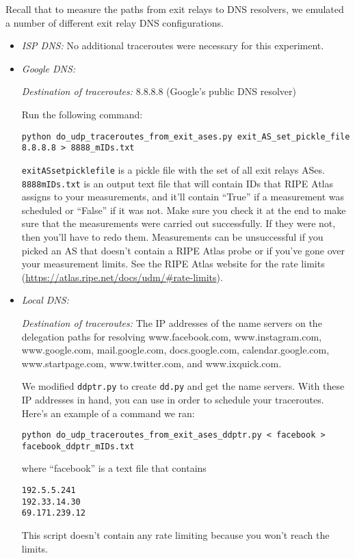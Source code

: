 \documentclass{article}
\begin{document}
Recall that to measure the paths from exit relays to DNS resolvers, we 
emulated a number of different exit relay DNS configurations.
\begin{itemize}

\item \emph{ISP DNS:} No additional traceroutes were necessary for this experiment. 

\item \emph{Google DNS:} 

\emph{Destination of traceroutes:} 8.8.8.8 (Google's public DNS resolver)

Run the following command:
\begin{lstlisting}
python do_udp_traceroutes_from_exit_ases.py exit_AS_set_pickle_file 8.8.8.8 > 8888_mIDs.txt
\end{lstlisting}
{\tt exit\textunderscore AS\textunderscore set\textunderscore pickle\textunderscore file} 
is a pickle file with the set of all exit relays ASes. 
{\tt 8888\textunderscore mIDs.txt} is an output text file that will contain IDs that RIPE Atlas 
assigns to your measurements, and it'll contain ``True'' if a measurement 
was scheduled or ``False'' if it was not. Make sure you check it at the end 
to make sure that the measurements were carried out successfully. If they were 
not, then you'll have to redo them. Measurements can be unsuccessful if you picked 
an AS that doesn't contain a RIPE Atlas probe or if you've gone over your 
measurement limits. See the RIPE Atlas website for the rate limits 
(\url{https://atlas.ripe.net/docs/udm/\#rate-limits}).

\item \emph{Local DNS:}

\emph{Destination of traceroutes:} The IP addresses of the name servers on the delegation 
paths for resolving www.facebook.com, www.instagram.com, www.google.com, 
mail.google.com, docs.google.com, calendar.google.com, www.startpage.com, 
www.twitter.com, and www.ixquick.com. 

We modified {\tt ddptr.py} to create {\tt dd.py} and get 
the name servers. With these IP addresses in hand, you can use 
 in order 
to schedule your traceroutes. Here's an example of a command we ran:
\begin{lstlisting}
python do_udp_traceroutes_from_exit_ases_ddptr.py < facebook > facebook_ddptr_mIDs.txt
\end{lstlisting}
where ``facebook'' is a text file that contains
\begin{lstlisting}
192.5.5.241
192.33.14.30
69.171.239.12
\end{lstlisting}
This script doesn't contain any rate limiting because you won't reach the limits.


\end{itemize}
\end{document}

